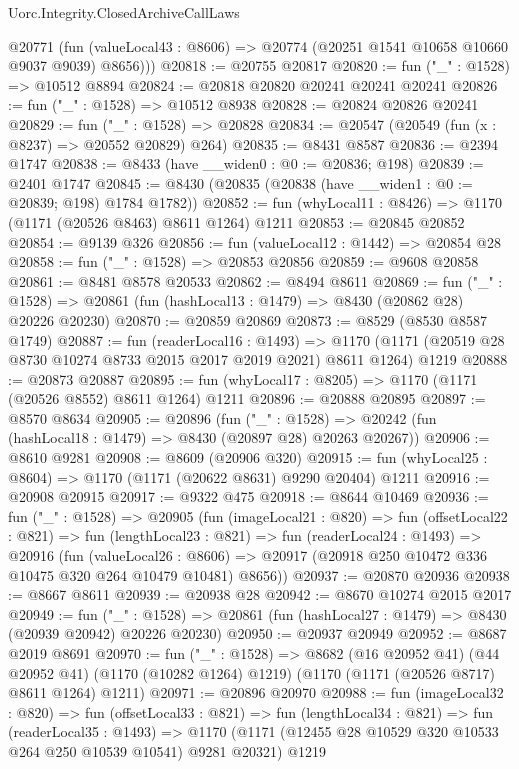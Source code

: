 \begin{lexlean}{Uorc.Integrity.ClosedArchiveCallLaws}
\begin{coremodule}
        @20771
        (fun (valueLocal43 : @8606) => @20774 (@20251 @1541 @10658 @10660 @9037 @9039) @8656)))
@20818 := @20755 @20817
@20820 := fun ("_" : @1528) => @10512 @8894
@20824 := @20818 @20820 @20241 @20241 @20241
@20826 := fun ("_" : @1528) => @10512 @8938
@20828 := @20824 @20826 @20241
@20829 := fun ("_" : @1528) => @20828
@20834 := @20547 (@20549 (fun (x : @8237) => @20552 @20829) @264)
@20835 := @8431 @8587
@20836 := @2394 @1747
@20838 := @8433 (have __widen0 : @0 := @20836; @198)
@20839 := @2401 @1747
@20845 := @8430 (@20835 (@20838 (have __widen1 : @0 := @20839; @198) @1784 @1782))
@20852 := fun (whyLocal11 : @8426) => @1170 (@1171 (@20526 @8463) @8611 @1264) @1211
@20853 := @20845 @20852
@20854 := @9139 @326
@20856 := fun (valueLocal12 : @1442) => @20854 @28
@20858 := fun ("_" : @1528) => @20853 @20856
@20859 := @9608 @20858
@20861 := @8481 @8578 @20533
@20862 := @8494 @8611
@20869 := fun ("_" : @1528) =>
  @20861 (fun (hashLocal13 : @1479) => @8430 (@20862 @28) @20226 @20230)
@20870 := @20859 @20869
@20873 := @8529 (@8530 @8587 @1749)
@20887 := fun (readerLocal16 : @1493) =>
  @1170 (@1171 (@20519 @28 @8730 @10274 @8733 @2015 @2017 @2019 @2021) @8611 @1264) @1219
@20888 := @20873 @20887
@20895 := fun (whyLocal17 : @8205) => @1170 (@1171 (@20526 @8552) @8611 @1264) @1211
@20896 := @20888 @20895
@20897 := @8570 @8634
@20905 := @20896
    (fun ("_" : @1528) => @20242 (fun (hashLocal18 : @1479) => @8430 (@20897 @28) @20263 @20267))
@20906 := @8610 @9281
@20908 := @8609 (@20906 @320)
@20915 := fun (whyLocal25 : @8604) => @1170 (@1171 (@20622 @8631) @9290 @20404) @1211
@20916 := @20908 @20915
@20917 := @9322 @475
@20918 := @8644 @10469
@20936 := fun ("_" : @1528) =>
  @20905
    (fun (imageLocal21 : @820) =>
    fun (offsetLocal22 : @821) =>
    fun (lengthLocal23 : @821) =>
    fun (readerLocal24 : @1493) =>
    @20916
      (fun (valueLocal26 : @8606) =>
      @20917 (@20918 @250 @10472 @336 @10475 @320 @264 @10479 @10481) @8656))
@20937 := @20870 @20936
@20938 := @8667 @8611
@20939 := @20938 @28
@20942 := @8670 @10274 @2015 @2017
@20949 := fun ("_" : @1528) =>
  @20861 (fun (hashLocal27 : @1479) => @8430 (@20939 @20942) @20226 @20230)
@20950 := @20937 @20949
@20952 := @8687 @2019 @8691
@20970 := fun ("_" : @1528) =>
  @8682
    (@16 @20952 @41)
    (@44 @20952 @41)
    (@1170 (@10282 @1264) @1219)
    (@1170 (@1171 (@20526 @8717) @8611 @1264) @1211)
@20971 := @20896 @20970
@20988 := fun (imageLocal32 : @820) =>
  fun (offsetLocal33 : @821) =>
  fun (lengthLocal34 : @821) =>
  fun (readerLocal35 : @1493) =>
  @1170 (@1171 (@12455 @28 @10529 @320 @10533 @264 @250 @10539 @10541) @9281 @20321) @1219

\end{coremodule}
\end{lexlean}
